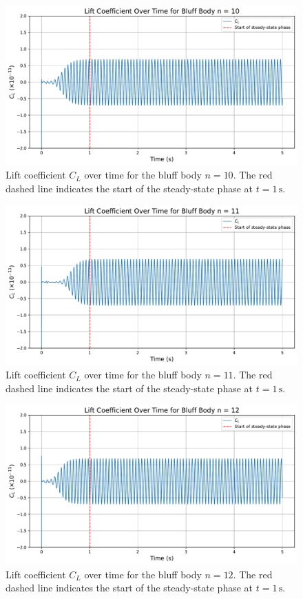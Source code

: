 \begin{figure}[H]
	\centering
	\includegraphics[width=\textwidth]{images/10face_graph}
	\caption{Lift coefficient $C_L$ over time for the bluff body $n=10$. The red dashed line indicates the start of the steady-state phase at $t = 1\,\mathrm{s}$.}
	\label{fig:10FaceGraph} 
\end{figure}

\begin{figure}[H]
	\centering
	\includegraphics[width=\textwidth]{images/11face_graph}
	\caption{Lift coefficient $C_L$ over time for the bluff body $n=11$. The red dashed line indicates the start of the steady-state phase at $t = 1\,\mathrm{s}$.}
	\label{fig:11FaceGraph} 
\end{figure}

\begin{figure}[H]
	\centering
	\includegraphics[width=\textwidth]{images/12face_graph}
	\caption{Lift coefficient $C_L$ over time for the bluff body $n=12$. The red dashed line indicates the start of the steady-state phase at $t = 1\,\mathrm{s}$.}
	\label{fig:12FaceGraph} 
\end{figure}

